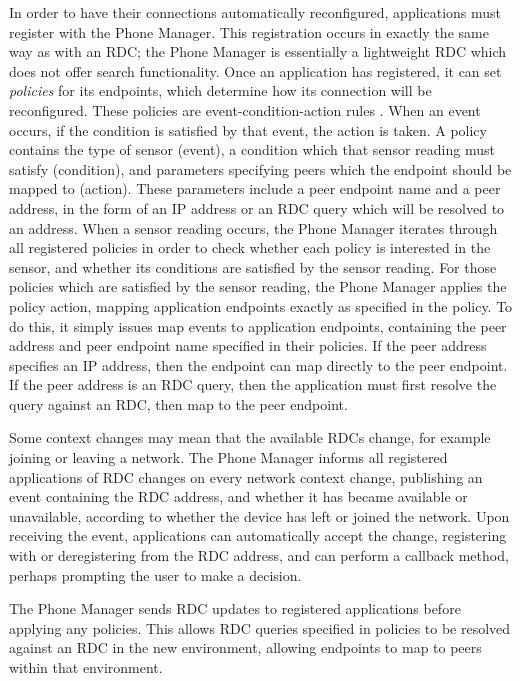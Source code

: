\documentclass[12pt,twoside,notitlepage]{report}
\begin{document}
In order to have their connections automatically reconfigured, applications must register with the Phone Manager. 
This registration occurs in exactly the same way as with an RDC; the Phone Manager is essentially a lightweight RDC which does not offer search functionality. 
Once an application has registered, it can set {\sl policies} for its endpoints, which determine how its connection will be reconfigured. 
These policies are event-condition-action rules \cite{mccarthy1989architecture}. 
When an event occurs, if the condition is satisfied by that event, the action is taken. 
A policy contains the type of sensor (event), a condition which that sensor reading must satisfy (condition), and parameters specifying peers which the endpoint should be mapped to (action). 
These parameters include a peer endpoint name and a peer address, in the form of an IP address or an RDC query which will be resolved to an address. 
When a sensor reading occurs, the Phone Manager iterates through all registered policies in order to check whether each policy is interested in the sensor, and whether its conditions are satisfied by the sensor reading. 
For those policies which are satisfied by the sensor reading, the Phone Manager applies the policy action, mapping application endpoints exactly as specified in the policy. 
To do this, it simply issues map events to application endpoints, containing the peer address and peer endpoint name specified in their policies. 
If the peer address specifies an IP address, then the endpoint can map directly to the peer endpoint. 
If the peer address is an RDC query, then the application must first resolve the query against an RDC, then map to the peer endpoint. 

Some context changes may mean that the available RDCs change, for example joining or leaving a network. 
The Phone Manager informs all registered applications of RDC changes on every network context change, publishing an event containing the RDC address, and whether it has became available or unavailable, according to whether the device has left or joined the network. 
Upon receiving the event, applications can automatically accept the change, registering with or deregistering from the RDC address, and can perform a callback method, perhaps prompting the user to make a decision. 

The Phone Manager sends RDC updates to registered applications before applying any policies. 
This allows RDC queries specified in policies to be resolved against an RDC in the new environment, allowing endpoints to map to peers within that environment. 
\end{document}
